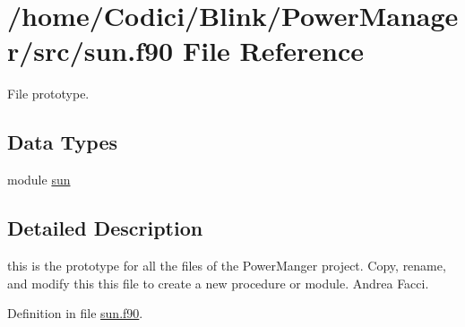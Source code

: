 \hypertarget{sun_8f90}{\section{/home/\-Codici/\-Blink/\-Power\-Manager/src/sun.f90 File Reference}
\label{sun_8f90}
}


File prototype.  


\subsection*{Data Types}
\begin{DoxyCompactItemize}
\item 
module \hyperlink{classsun}{sun}
\end{DoxyCompactItemize}


\subsection{Detailed Description}
this is the prototype for all the files of the Power\-Manger project. Copy, rename, and modify this this file to create a new procedure or module.  Andrea Facci. 

Definition in file \hyperlink{sun_8f90_source}{sun.\-f90}.

